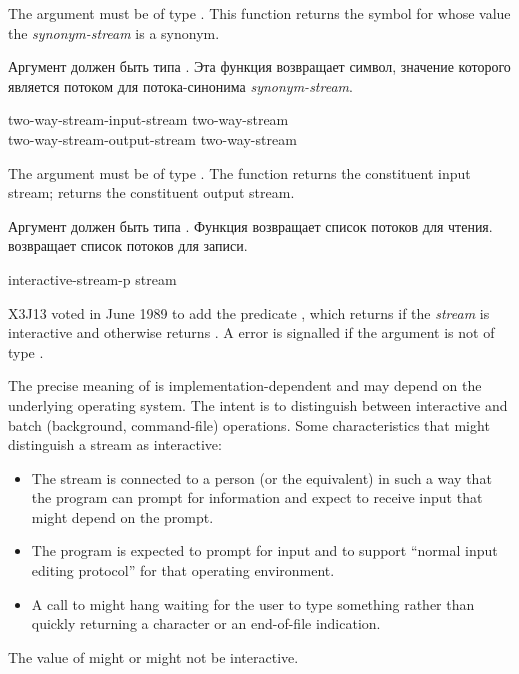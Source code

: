 \begin{new}
\begin{defun}[Function]
The argument must be of type .  This function returns
the symbol for whose value the \emph{synonym-stream} is a synonym.

Аргумент должен быть типа . Эта функция возвращает символ,
значение которого является потоком для потока-синонима \emph{synonym-stream}.
\end{defun}


\begin{defun}[Function]
two-way-stream-input-stream two-way-stream \\
two-way-stream-output-stream two-way-stream

The argument must be of type .
The function  returns the constituent
input stream;  returns the constituent
output stream.

Аргумент должен быть типа .
Функция  возвращает список потоков для чтения. 
 возвращает список потоков для записи.
\end{defun}
\end{new}

\begin{newer}
\begin{defun}[Function]
interactive-stream-p stream

X3J13 voted in June 1989  to add the
predicate , which returns 
if the \emph{stream\/} is interactive and otherwise returns .
A  error is signalled if the argument is not of type .

The precise meaning of  is implementation-dependent
and may depend on the underlying operating system.
The intent is to distinguish between interactive and batch (background,
command-file) operations.  Some characteristics that might
distinguish a stream as interactive:
\begin{itemize}
\item The stream is connected to a person (or the equivalent)
in such a way that the program can prompt for information and
expect to receive input that might depend on the prompt.
\item The program is expected to prompt for input and to support
``normal input editing protocol'' for that operating environment.
\item A call to  might hang waiting for the user to type something
rather than quickly returning a character or an end-of-file
indication.
\end{itemize}
The value of  might or might not be interactive.
\end{defun}
\end{newer}

